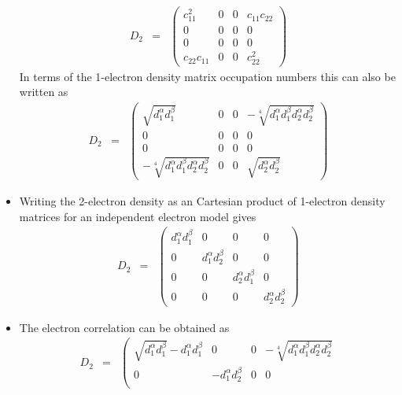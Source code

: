 \documentclass{amsart}
\begin{document}
\begin{itemize}
        \begin{eqnarray}
         D_{2} &=&
         \left(\begin{matrix}
         c_{11}^2 & 0 & 0 & c_{11}c_{22} \\
         0 & 0 & 0 & 0 \\
         0 & 0 & 0 & 0 \\
         c_{22}c_{11} & 0 &0 & c_{22}^2
         \end{matrix}\right)
        \end{eqnarray}
        In terms of the 1-electron density matrix occupation numbers this can also be written as
        \begin{eqnarray}
        \label{Eq:D2-2el-2orb}
         D_{2} &=&
         \left(\begin{matrix}
         \sqrt{d_1^\alpha d_1^\beta} & 0 & 0 & -\sqrt[4]{d_1^\alpha d_1^\beta d_2^\alpha d_2^\beta} \\
         0 & 0 & 0 & 0 \\
         0 & 0 & 0 & 0 \\
         -\sqrt[4]{d_1^\alpha d_1^\beta d_2^\alpha d_2^\beta} & 0 &0 & \sqrt{d_2^\alpha d_2^\beta} 
         \end{matrix}\right)
        \end{eqnarray}
\item Writing the 2-electron density as an Cartesian product of 1-electron density matrices for an 
         independent electron model gives
         \begin{eqnarray}
         D_{2} &=&
         \left(\begin{matrix}
         d_1^\alpha d_1^\beta & 0 & 0 & 0\\
         0 & d_1^\alpha d_2^\beta & 0 & 0 \\
         0 & 0 & d_2^\alpha d_1^\beta & 0 \\
         0 & 0 &0 & d_2^\alpha d_2^\beta
         \end{matrix}\right)
        \end{eqnarray}
\item The electron correlation can be obtained as
         \begin{eqnarray}
         \label{Eq:Ecorrelation-2el-2orb}
         D_{2} &=&
         \left(\begin{matrix}
         \sqrt{d_1^\alpha d_1^\beta} - d_1^\alpha d_1^\beta & 0 & 0 & -\sqrt[4]{d_1^\alpha d_1^\beta d_2^\alpha d_2^\beta} \\
         0 & - d_1^\alpha d_2^\beta & 0 & 0 \\

\end{matrix}
\end{eqnarray}
\end{itemize}
\end{document}
